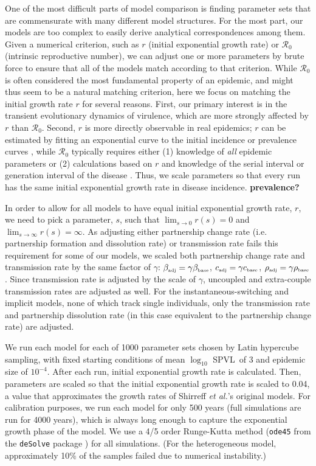 \documentclass[10pt,letterpaper]{article}
\newcommand{\Lspvl}{$\log_{10}$ SPVL}
\newcommand{\rzero}{{\mathcal R}_0}
\newcommand{\etal}{\textit{et al.}}
\newcommand{\tsub}[2]{#1_{{\textrm{\tiny #2}}}}
\newcommand{\todo}[1]{{\color{red} \textbf{#1}}}
\begin{document}
One of the most difficult parts of model comparison is finding
parameter sets that are commensurate with many different model
structures. For the most part, our models are too complex to easily
derive analytical correspondences among them. Given a numerical
criterion, such as $r$ (initial exponential growth rate) or $\rzero$ 
(intrinsic reproductive number), we can adjust one or more
parameters by brute force to ensure that all of the models match
according to that criterion. While $\rzero$ is often considered
the most fundamental property of an epidemic, and might thus seem to
be a natural matching criterion, here we focus on matching the initial
growth rate $r$ for several reasons. First, our primary interest is in
the transient evolutionary dynamics of virulence, which are more
strongly affected by $r$ than $\rzero$. Second, $r$ is 
more directly observable in real epidemics; $r$ can be estimated by
fitting an exponential curve to the initial incidence or
prevalence curves \cite{ma_estimating_2014}, while $\rzero$
typically requires either (1) knowledge of \emph{all} epidemic
parameters or (2) calculations based on
$r$ and knowledge of the serial interval or generation interval of the
disease \cite{wallinga_how_2007}. Thus, we scale parameters so that
every run has the same initial exponential growth rate in 
disease incidence. \todo{prevalence?}

In order to allow for all models to have equal initial exponential
growth rate, $r$, we need to pick a parameter, $s$, such that
$\lim_{s\to 0} r(s) = 0$ and $\lim_{s\to\infty} r(s) = \infty$. As
adjusting either partnership change rate (i.e. partnership formation
and dissolution rate) or transmission rate fails this requirement for
some of our models, we scaled both partnership change rate and
transmission rate by the same factor of $\gamma$: $\tsub{\beta}{adj} =
\gamma \tsub{\beta}{base}$, $\tsub{c}{adj} = \gamma \tsub{c}{base}$,
$\tsub{\rho}{adj} = \gamma \tsub{\rho}{base}$. Since transmission rate
is adjusted by the scale of $\gamma$, uncoupled and extra-couple
transmission rates are adjusted as well. For the instantaneous-switching
and implicit models, none of which track single individuals, 
only the transmission rate and partnership
dissolution rate (in this case equivalent to the partnership change
rate) are adjusted.

We run each model for each of 1000 parameter sets chosen by Latin hypercube sampling, with fixed starting conditions
of mean \Lspvl\ of 3 and epidemic size of $10^{-4}$. After each run, initial exponential growth rate is calculated. Then, parameters are scaled so that the initial exponential growth rate is scaled to 0.04, a value that approximates the growth rates of Shirreff \etal's original models.
For calibration purposes, we run each model for only 500 years
(full simulations are run for 4000 years), which is always long
enough to capture the exponential growth phase of the model. 
We use a 4/5 order 
Runge-Kutta method (\texttt{ode45} from the \texttt{deSolve} package
\cite{soetaert_solving_2010}) for all simulations. 
(For the heterogeneous model, approximately
10\% of the samples failed due to numerical instability.)
\end{document}
